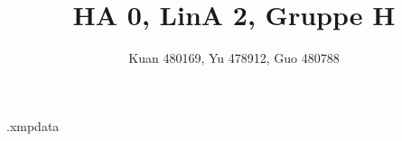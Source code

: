 


\begin{filecontents*}{\jobname.xmpdata}
\end{filecontents*}

\documentclass[12pt]{scrartcl}

%


\usepackage[ngerman]{babel}

\usepackage{amsmath,mathtools,fontspec,amsthm,interval,mathtools}

\usepackage[libertinus]{fontsetup}

\theoremstyle{remark}
\newtheorem*{Behauptung}{Behauptung}
\newtheorem*{Lemma}{Lemma}

\title{HA 0, LinA 2, Gruppe H}
\author{Kuan 480169, Yu 478912, Guo 480788}
\providecommand{\abs}[1]{\left\lvert#1\right\rvert}
\providecommand{\norm}[1]{\left\lVert#1\right\rVert}
\DeclareMathOperator{\Span}{Span}
\DeclareMathOperator{\Ker}{Ker}
\DeclareMathOperator{\Img}{Im}


\maketitle
\begin{center}
  Ting Yu Kuan 480169, Shilong Yu 478912, Yuchen Guo 480788
\end{center}

\newpage

\section*{Injektiv, Surjektiv, Bijektiv}
